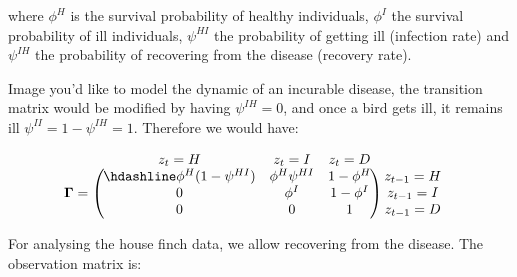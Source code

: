 \documentclass[
  12pt,
]{krantz}
\begin{document}
where \(\phi^H\) is the survival probability of healthy individuals, \(\phi^I\) the survival probability of ill individuals, \(\psi^{HI}\) the probability of getting ill (infection rate) and \(\psi^{IH}\) the probability of recovering from the disease (recovery rate).

Image you'd like to model the dynamic of an incurable disease, the transition matrix would be modified by having \(\psi^{IH} = 0\), and once a bird gets ill, it remains ill \(\psi^{II} = 1 - \psi^{IH} = 1\). Therefore we would have:

\[\begin{matrix}
& \\
\mathbf{\Gamma} =
    \left ( \vphantom{ \begin{matrix} 12 \\ 12 \\ 12 \end{matrix} } \right .
\end{matrix}
\hspace{-1.2em}
\begin{matrix}
    z_t=H & z_t=I & z_t=D \\ \hdashline
\phi^H (1-\psi^{HI}) & \phi^H \psi^{HI} & 1 - \phi^H\\
0 & \phi^{I}  & 1 - \phi^{I}\\
0 & 0 & 1
\end{matrix}
\hspace{-0.2em}
\begin{matrix}
& \\
\left . \vphantom{ \begin{matrix} 12 \\ 12 \\ 12 \end{matrix} } \right )
    \begin{matrix}
    z_{t-1}=H \\ z_{t-1}=I \\ z_{t-1}=D
    \end{matrix}
\end{matrix}\]

For analysing the house finch data, we allow recovering from the disease. The observation matrix is:
\end{document}
